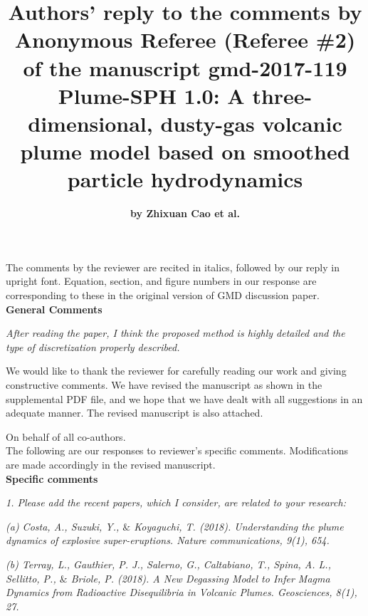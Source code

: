 \documentclass{article}
\begin{document}
\author{\Large \textbf{by Zhixuan Cao et al.}}

\title{ \Large{ Authors' reply to the comments by Anonymous Referee (Referee \#2) of the manuscript gmd-2017-119} \\
\LARGE \textbf{Plume-SPH 1.0: A three-dimensional, dusty-gas volcanic plume model based on smoothed particle hydrodynamics}}

\date{\vspace{-5ex}}

\maketitle
The comments by the reviewer are recited in italics, followed by our reply in upright font. Equation, section, and figure numbers   in our response are corresponding to these in the original 
version of GMD discussion paper. \\[12pt]

\textbf{\large General Comments}

\textit{After reading the paper, I think the proposed method is highly detailed and the type of discretization properly described.} 

We would like to thank the reviewer for carefully reading our work and giving constructive comments.
We have revised the manuscript as shown in the supplemental PDF file, and we hope that we have dealt with all suggestions in an adequate manner. The revised manuscript is also attached.
 
On behalf of all co-authors. \\[1pt]

The following are our responses to reviewer's specific comments. Modifications are made accordingly in the revised manuscript. \\[12pt]

\textbf{\large Specific comments}

\textit{1. Please add the recent papers, which I consider, are related to your research: }

\textit{(a) Costa, A., Suzuki, Y., $\&$ Koyaguchi, T. (2018). Understanding the plume dynamics of explosive super-eruptions. Nature communications, 9(1), 654.}

\textit{(b) Terray, L., Gauthier, P. J., Salerno, G., Caltabiano, T., Spina, A. L., Sellitto, P., $\&$ Briole, P. (2018). A New Degassing Model to Infer Magma Dynamics from Radioactive Disequilibria in Volcanic Plumes. Geosciences, 8(1), 27.}
\end{document}

